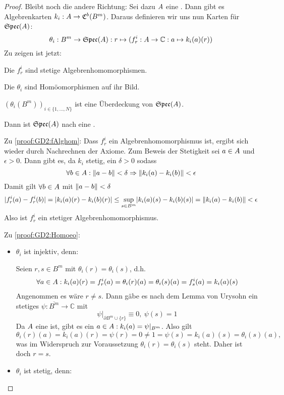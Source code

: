 \begin{proof}
Bleibt noch die andere Richtung: Sei dazu $A$ eine \CAlgMan{}. Dann gibt es Algebrenkarten $k_i: A \to \mathfrak{C}^b(B^m)$. Daraus  definieren wir uns nun Karten für $\mathfrak{Spec}(A)$:
	\[\theta_i: B^m \to \mathfrak{Spec}(A): r \mapsto (f_r^i: A \to \mathbb{C}: a \mapsto k_i(a)(r)) \]
Zu zeigen ist jetzt:
\begin{proofenum}
	\setcounter{proofenumi}{\value{temp}}
	\item \label{proof:GD2:fAlghom}
		Die $f_r^i$ sind stetige Algebrenhomomorphismen.
	\item \label{proof:GD2:Homoeo}
		Die $\theta_i$ sind Homöomorphismen auf ihr Bild.
	\item \label{proof:GD2:Ueberdeckung}
		$(\theta_i(B^m))_{i\in\{1,\dots,N\}}$ ist eine Überdeckung von $\mathfrak{Spec}(A)$.
\end{proofenum}
Dann ist $\mathfrak{Spec}(A)$ nach  eine \komTopMan.

Zu \ref{proof:GD2:fAlghom}: Dass $f_r^i$ ein Algebrenhomomorphismus ist, ergibt sich wieder durch Nachrechnen der Axiome. Zum Beweis der Stetigkeit sei $a \in A$ und $\epsilon > 0$. Dann gibt es, da $k_i$ stetig, ein $\delta>0$ sodass 
\[\forall b \in A: \left\lVert a-b\right\rVert < \delta \Rightarrow \left\lVert k_i(a)-k_i(b)\right\rVert < \epsilon\]
Damit gilt $\forall b \in A$ mit $\left\lVert a-b\right\rVert < \delta$
\[ |f_r^i(a) - f_r^i(b)| = |k_i(a)(r)-k_i(b)(r)| \leq \underset{s \in B^m}{\sup} |k_i(a)(s)-k_i(b)(s)| = \left\lVert k_i(a)-k_i(b)\right\rVert < \epsilon\]
Also ist $f_r^i$ ein stetiger Algebrenhomomorphismus.

Zu \ref{proof:GD2:Homoeo}: \begin{itemize}
	\item $\theta_i$ ist injektiv, denn:
	
	Seien $r, s \in B^m$ mit $\theta_i(r) = \theta_i(s)$, d.h. 
	\begin{align*}
		\forall a \in A: k_i(a)(r) = f_r^i(a) = \theta_i(r)(a) = \theta_i(s)(a) = f_s^i(a)  = k_i(a)(s)
	\end{align*}
	Angenommen es wäre $r \neq s$. Dann gäbe es nach dem Lemma von Urysohn ein stetiges $\psi: \overline{B^m} \to \mathbb{C}$ mit
	\[\psi|_{\partial B^m \cup \{r\}} \equiv 0, ~\psi(s) = 1\]
	Da $A$ eine \CAlgMan{} ist, gibt es ein $a \in A: k_i(a) = \psi|_{B^m}$. Also gilt 
	\[\theta_i(r)(a) = k_i(a)(r) = \psi(r) = 0 \neq 1 = \psi(s) = k_i(a)(s) = \theta_i(s)(a),\]
	was im Widerspruch zur Voraussetzung $\theta_i(r) = \theta_i(s)$ steht. Daher ist doch $r = s$.
	
	\item $\theta_i$ ist stetig, denn:
	

\end{itemize}
\end{proof}

